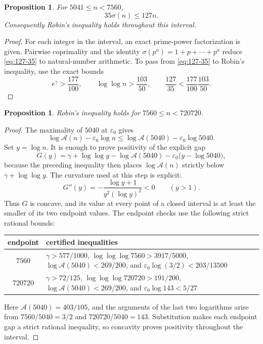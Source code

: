 \documentclass[11pt]{amsart}
\newtheorem{proposition}[theorem]{Proposition}
\theoremstyle{definition}
\theoremstyle{remark}
\numberwithin{equation}{section}
\newcommand{\euler}{\gamma}
\newcommand{\sig}{\sigma}
\newcommand{\A}{\mathcal{A}}
\newcommand{\eps}{\varepsilon}
\begin{document}
\begin{proposition}\label{prop:small-factor}
For $5041\le n<7560$,
\begin{equation}\label{eq:127-35}
  35\sig(n)\le127n.
\end{equation}
Consequently Robin's inequality holds throughout this interval.
\end{proposition}

\begin{proof}
For each integer in the interval, an exact prime-power factorization is
given.  Pairwise coprimality and the identity
$\sig(p^a)=1+p+\cdots+p^a$ reduce \eqref{eq:127-35} to natural-number
arithmetic.  To pass from \eqref{eq:127-35} to Robin's inequality, use the
exact bounds
\[
  e^{\euler}>\frac{177}{100},
  \qquad
  \log\log n>\frac{103}{50},
  \qquad
  \frac{127}{35}<\frac{177}{100}\frac{103}{50}.
\]
\end{proof}

\begin{proposition}\label{prop:startup-tangent}
Robin's inequality holds for $7560\le n<720720$.
\end{proposition}

\begin{proof}
The maximality of $5040$ at $\eps_0$ gives
\[
  \log\A(n)-\eps_0\log n
  \le \log\A(5040)-\eps_0\log5040.
\]
Set $y=\log n$.  It is enough to prove positivity of the explicit gap
\[
 G(y)=\euler+\log\log y-\log\A(5040)
      -\eps_0\bigl(y-\log5040\bigr),
\]
because the preceding inequality then places $\log\A(n)$ strictly below
$\euler+\log\log y$.  The curvature used at this step is explicit:
\[
 G''(y)=-\frac{\log y+1}{y^2(\log y)^2}<0\qquad(y>1).
\]
Thus $G$ is concave, and its value at every point of a closed interval is at
least the smaller of its two endpoint values.  The endpoint checks use the
following strict rational bounds:
\begin{center}
\begin{tabular}{@{}cp{}@{}}
\toprule
endpoint & certified inequalities \\
\midrule
$7560$ & $\euler>577/1000$, $\log\log\log7560>3917/5000$,
  $\log\A(5040)<269/200$, and
  $\eps_0\log(3/2)<203/13500$ \\
$720720$ & $\euler>72/125$, $\log\log\log720720>191/200$,
  $\log\A(5040)<269/200$, and $\eps_0\log143<5/27$ \\
\bottomrule
\end{tabular}
\end{center}
Here $\A(5040)=403/105$, and the arguments of the last two logarithms arise
from $7560/5040=3/2$ and $720720/5040=143$.  Substitution makes each endpoint
gap a strict rational inequality, so concavity proves positivity throughout
the interval.
\end{proof}
\end{document}
